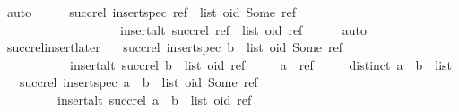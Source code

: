 \begin{isabellebody}
\ auto\isanewline
\ \ \isamarkupfalse%
\ \isamarkupfalse%
\ {\isachardoublequoteopen}succ{\isacharunderscore}rel\ {\isacharparenleft}insert{\isacharunderscore}spec\ {\isacharparenleft}ref\ {\isacharhash}\ list{\isacharparenright}\ {\isacharparenleft}oid{\isacharcomma}\ Some\ ref{\isacharparenright}{\isacharparenright}\ {\isacharequal}\isanewline
\ \ \ \ \ \ \ \ \ \ \ \ \ \ \ \ \ \ \ insert{\isacharunderscore}alt\ {\isacharparenleft}succ{\isacharunderscore}rel\ {\isacharparenleft}ref\ {\isacharhash}\ list{\isacharparenright}{\isacharparenright}\ {\isacharparenleft}oid{\isacharcomma}\ ref{\isacharparenright}{\isachardoublequoteclose}\isanewline
\ \ \ \ \isamarkupfalse%
\ auto\isanewline
{}\isamarkupfalse%
%
\endisatagproof
{\isafoldproof}%
%
\isadelimproof
\isanewline
%
\endisadelimproof
\isanewline
{}\isamarkupfalse%
\ succ{\isacharunderscore}rel{\isacharunderscore}insert{\isacharunderscore}later{\isacharcolon}\isanewline
\ \ \ {\isachardoublequoteopen}succ{\isacharunderscore}rel\ {\isacharparenleft}insert{\isacharunderscore}spec\ {\isacharparenleft}b\ {\isacharhash}\ list{\isacharparenright}\ {\isacharparenleft}oid{\isacharcomma}\ Some\ ref{\isacharparenright}{\isacharparenright}\ {\isacharequal}\isanewline
\ \ \ \ \ \ \ \ \ \ \ insert{\isacharunderscore}alt\ {\isacharparenleft}succ{\isacharunderscore}rel\ {\isacharparenleft}b\ {\isacharhash}\ list{\isacharparenright}{\isacharparenright}\ {\isacharparenleft}oid{\isacharcomma}\ ref{\isacharparenright}{\isachardoublequoteclose}\isanewline
\ \ \ \ \ {\isachardoublequoteopen}a\ {\isasymnoteq}\ ref{\isachardoublequoteclose}\isanewline
\ \ \ \ \ {\isachardoublequoteopen}distinct\ {\isacharparenleft}a\ {\isacharhash}\ b\ {\isacharhash}\ list{\isacharparenright}{\isachardoublequoteclose}\isanewline
\ \ \ {\isachardoublequoteopen}succ{\isacharunderscore}rel\ {\isacharparenleft}insert{\isacharunderscore}spec\ {\isacharparenleft}a\ {\isacharhash}\ b\ {\isacharhash}\ list{\isacharparenright}\ {\isacharparenleft}oid{\isacharcomma}\ Some\ ref{\isacharparenright}{\isacharparenright}\ {\isacharequal}\isanewline
\ \ \ \ \ \ \ \ \ insert{\isacharunderscore}alt\ {\isacharparenleft}succ{\isacharunderscore}rel\ {\isacharparenleft}a\ {\isacharhash}\ b\ {\isacharhash}\ list{\isacharparenright}{\isacharparenright}\ {\isacharparenleft}oid{\isacharcomma}\ ref{\isacharparenright}{\isachardoublequoteclose}\isanewline
%
\isadelimproof
%
\endisadelimproof
%
\isatagproof
{}\isamarkupfalse%

\end{isabellebody}
